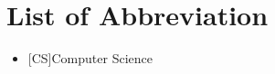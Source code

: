 







\chapter*{List of Abbreviation}
\label{acronyms}
\begin{itemize}

\item[]
\begin{acronym}[Symbols]
	\acro{}[CS]{Computer Science}\\
\end{acronym}
\end{itemize}

    
	


